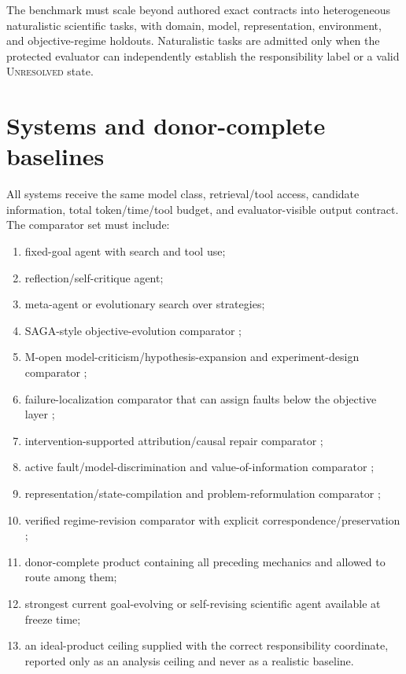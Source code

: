 \documentclass[11pt]{article}
\begin{document}
The benchmark must scale beyond authored exact contracts into heterogeneous naturalistic scientific tasks, with domain, model, representation, environment, and objective-regime holdouts. Naturalistic tasks are admitted only when the protected evaluator can independently establish the responsibility label or a valid \textsc{Unresolved} state.

\section{Systems and donor-complete baselines}
All systems receive the same model class, retrieval/tool access, candidate information, total token/time/tool budget, and evaluator-visible output contract. The comparator set must include:
\begin{enumerate}[leftmargin=*]
    \item fixed-goal agent with search and tool use;
    \item reflection/self-critique agent;
    \item meta-agent or evolutionary search over strategies;
    \item SAGA-style objective-evolution comparator \cite{saga2026};
    \item M-open model-criticism/hypothesis-expansion and experiment-design comparator \cite{mda2026};
    \item failure-localization comparator that can assign faults below the objective layer \cite{modelorharness2026};
    \item intervention-supported attribution/causal repair comparator \cite{reflect2026,architect2026};
    \item active fault/model-discrimination and value-of-information comparator \cite{activefault2019};
    \item representation/state-compilation and problem-reformulation comparator \cite{planningreform2023};
    \item verified regime-revision comparator with explicit correspondence/preservation \cite{selfrevising2026};
    \item donor-complete product containing all preceding mechanics and allowed to route among them;
    \item strongest current goal-evolving or self-revising scientific agent available at freeze time;
    \item an ideal-product ceiling supplied with the correct responsibility coordinate, reported only as an analysis ceiling and never as a realistic baseline.
\end{enumerate}
\end{document}
